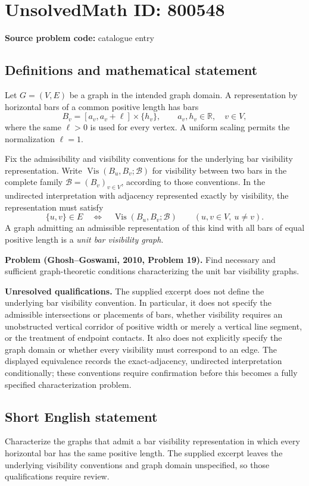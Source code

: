 \documentclass[11pt]{article}
\newcommand{\R}{\mathbb{R}}
\begin{document}
\section*{UnsolvedMath ID: 800548}
\textbf{Source problem code:} catalogue entry
\subsection{Definitions and mathematical statement}
Let \(G=(V,E)\) be a graph in the intended graph domain. A representation by horizontal bars of a common positive length has bars
\[
B_v=[a_v,a_v+\ell]\times\{h_v\},\qquad a_v,h_v\in\R,\quad v\in V,
\]
where the same \(\ell>0\) is used for every vertex. A uniform scaling permits the normalization \(\ell=1\).

Fix the admissibility and visibility conventions for the underlying bar visibility representation. Write \(\operatorname{Vis}(B_u,B_v;\mathcal B)\) for visibility between two bars in the complete family \(\mathcal B=(B_v)_{v\in V}\), according to those conventions. In the undirected interpretation with adjacency represented exactly by visibility, the representation must satisfy
\[
\{u,v\}\in E
\quad\Longleftrightarrow\quad
\operatorname{Vis}(B_u,B_v;\mathcal B)
\qquad(u,v\in V,\ u\ne v).
\]
A graph admitting an admissible representation of this kind with all bars of equal positive length is a \emph{unit bar visibility graph}.

\textbf{Problem (Ghosh--Goswami, 2010, Problem 19).} Find necessary and sufficient graph-theoretic conditions characterizing the unit bar visibility graphs.

\textbf{Unresolved qualifications.} The supplied excerpt does not define the underlying bar visibility convention. In particular, it does not specify the admissible intersections or placements of bars, whether visibility requires an unobstructed vertical corridor of positive width or merely a vertical line segment, or the treatment of endpoint contacts. It also does not explicitly specify the graph domain or whether every visibility must correspond to an edge. The displayed equivalence records the exact-adjacency, undirected interpretation conditionally; these conventions require confirmation before this becomes a fully specified characterization problem.
\subsection{Short English statement}
Characterize the graphs that admit a bar visibility representation in which every horizontal bar has the same positive length. The supplied excerpt leaves the underlying visibility conventions and graph domain unspecified, so those qualifications require review.
\end{document}
